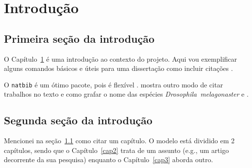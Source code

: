 
\chapter{Introdução}\label{intro}
\section{Primeira seção da introdução}\label{intro:historico}

O Capítulo~\ref{intro} é uma introdução ao contexto do projeto.
Aqui vou exemplificar alguns comandos básicos e úteis para uma dissertação como incluir citações \citep{Sand-Jensen2007}.

O \texttt{natbib} é um ótimo pacote, pois é flexível \citep[ver detalhes em][]{Kirk2008}.
\citet{Emlet1987} mostra outro modo de citar trabalhos no texto e como grafar o nome das espécies \emph{Drosophila~melagonaster} e \subde.

\section{Segunda seção da introdução}\label{intro:contexto}

Mencionei na seção~\ref{intro:historico} como citar um capítulo.
O modelo está dividido em 2 capítulos, sendo que o Capítulo~\ref{cap2} trata de um assunto (e.g., um artigo decorrente da sua pesquisa) enquanto o Capítulo~\ref{cap3} aborda outro.


